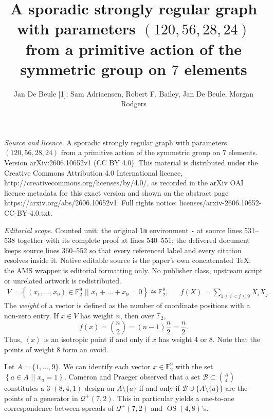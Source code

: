 \documentclass[10pt,a4paper]{amsart}
\newcommand{\FF}{\mathbb F}
\renewcommand{\leq}{\leqslant}
\newcommand{\vspan}[1]{\left \langle #1 \right \rangle}
\newcommand{\sett}[2]{ \left\{ #1 \, \, || \, \, #2 \right \} }
\newcommand{\mb}{\mathcal B}
\newcommand{\mq}{\mathcal Q}
\DeclareMathOperator{\OS}{OS}
\begin{document}
\title[A sporadic strongly regular graph with parameters (120,56,28]{A sporadic strongly regular graph with parameters $(120,56,28,24)$ from a primitive action of the symmetric group on $7$ elements}
\author{Jan De Beule [1]; Sam Adriaensen, Robert F. Bailey, Jan De Beule, Morgan Rodgers}
\date{}
\maketitle
\noindent\emph{Source and licence.} A sporadic strongly regular graph with parameters $(120,56,28,24)$ from a primitive action of the symmetric group on $7$ elements. Version arXiv:2606.10652v1 (CC BY 4.0). This material is distributed under the Creative Commons Attribution 4.0 International licence, http://creativecommons.org/licenses/by/4.0/, as recorded in the arXiv OAI licence metadata for this exact version and shown on the abstract page https://arxiv.org/abs/2606.10652v1. Full rights notice: licenses/arxiv-2606.10652-CC-BY-4.0.txt.\par\smallskip
\noindent\textit{Editorial scope.} Counted unit: the original \texttt{lm} environment \texttt{-} at source lines 531--538 together with its complete proof at lines 540--551; the delivered document keeps source lines 360--552 so that every referenced label and every citation resolves inside it. Native editable source is the paper's own concatenated TeX; the AMS wrapper is editorial formatting only. No publisher class, upstream script or unrelated artwork is redistributed.
\begin{align}
 \label{Eq:CP}
 V = \sett{(x_1, \ldots, x_9) \in \FF_2^9}{x_1 + \ldots + x_9 = 0} \cong \FF_2^8,
 && f(X) = \sum_{1 \leq i < j \leq 9} X_i X_j.
\end{align}
The \emph{weight} of a vector is defined as the number of coordinate positions with a non-zero entry.
If $x \in V$ has weight $n$, then over $\FF_2$,
\[
 f(x) = \binom n2 = (n-1) \frac n2 = \frac n2.
\]
Thus, $\vspan x$ is an isotropic point if and only if $x$ has weight 4 or 8.
Note that the points of weight 8 form an ovoid.

Let $A = \{1, \dots, 9\}$.
We can identify each vector $x \in \FF_2^9$ with the set $\sett{a \in A}{x_a = 1}$.
Cameron and Praeger \cite{Cameron:Praeger} observed that a set $\mb \subset \binom A4$ constitutes a $3$-$(8,4,1)$ design on $A \setminus \{a\}$ if and only if $\mb \cup \{ A \setminus \{a\}\}$ are the points of a generator in $\mq^+(7,2)$.
This in particular yields a one-to-one correspondence between spreads of $\mq^+(7,2)$ and $\OS(4,8)$'s.
\end{document}
